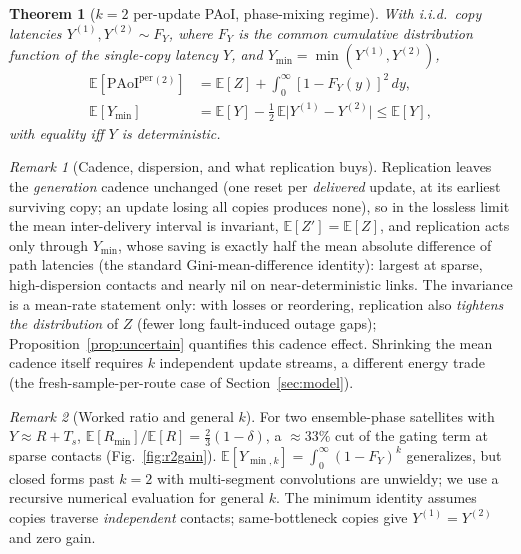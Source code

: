 \documentclass[twocolumn,3p,times,procedia]{elsarticle}
\theoremstyle{plain}
\newtheorem{theorem}{Theorem}
\theoremstyle{remark}
\newtheorem{remark}{Remark}
\newcommand{\PAoIper}{\mathrm{PAoI}^{\mathrm{per}}}
\newcommand{\E}{\mathbb{E}}
\newcommand{\Rmin}{R_{\min}}
\newcommand{\Ymin}{Y_{\min}}
\begin{document}
\begin{theorem}[$k{=}2$ per-update PAoI, phase-mixing regime]\label{thm:r2}
With i.i.d.\ copy latencies $Y^{(1)},Y^{(2)}\sim F_Y$, where $F_Y$ is
the common cumulative distribution function of the single-copy latency
$Y$, and $\Ymin=\min(Y^{(1)},Y^{(2)})$,
\begin{align}
\E[\PAoIper{}^{(2)}]&=\E[Z]+\int_0^\infty[1-F_Y(y)]^2\,dy,\\
\E[\Ymin]&=\E[Y]-\tfrac12\,\E\bigl|Y^{(1)}-Y^{(2)}\bigr|\le\E[Y],
\end{align}
with equality iff $Y$ is deterministic.
\end{theorem}

\begin{remark}[Cadence, dispersion, and what replication buys]
Replication leaves the \emph{generation} cadence unchanged (one reset
per \emph{delivered} update, at its earliest surviving copy; an update
losing all copies produces none), so in the lossless limit
the mean inter-delivery interval is invariant, $\E[Z']{=}\E[Z]$, and
replication acts only through $\Ymin$, whose saving is exactly half
the mean absolute difference of path latencies (the standard
Gini-mean-difference identity): largest at sparse, high-dispersion
contacts and nearly nil on near-deterministic links. The invariance is a
mean-rate statement only: with losses or reordering, replication also
\emph{tightens the distribution} of $Z$ (fewer long fault-induced
outage gaps); Proposition~\ref{prop:uncertain} quantifies this cadence
effect. Shrinking the mean cadence itself requires $k$ independent
update streams, a different energy trade (the fresh-sample-per-route
case of Section~\ref{sec:model}).
\end{remark}

\begin{remark}[Worked ratio and general $k$]
For two ensemble-phase satellites with $Y\approx R+T_s$,
$\E[\Rmin]/\E[R]=\tfrac23(1-\delta)$, a ${\approx}33\%$ cut of the
gating term at sparse contacts (Fig.~\ref{fig:r2gain}).
$\E[Y_{\min,k}]=\int_0^\infty(1-F_Y)^k$ generalizes, but closed forms
past $k{=}2$ with multi-segment convolutions are unwieldy; we use a
recursive numerical evaluation for general $k$. The minimum identity
assumes copies traverse \emph{independent} contacts; same-bottleneck
copies give $Y^{(1)}{=}Y^{(2)}$ and zero gain.
\end{remark}



\end{document}
